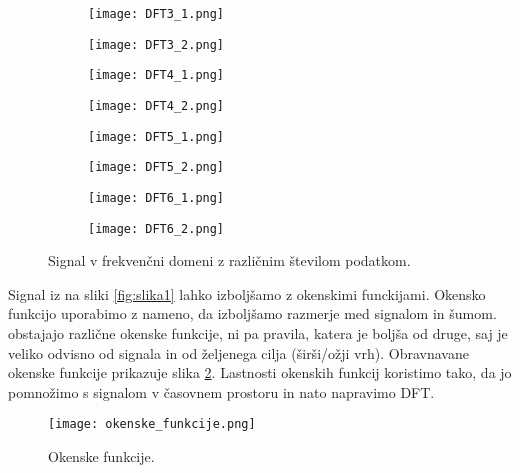 \documentclass[12pt,a4paper]{article}
\begin{document}
\begin{figure}[H]
    \centering
    \begin{subfigure}[b]{0.45\textwidth}
        \texttt{[image: DFT3\_1.png]}
    \end{subfigure}
    \begin{subfigure}[b]{0.45\textwidth}
        \texttt{[image: DFT3\_2.png]}
    \end{subfigure}
    
        \begin{subfigure}[b]{0.45\textwidth}
        \texttt{[image: DFT4\_1.png]}
    \end{subfigure}
    \begin{subfigure}[b]{0.45\textwidth}
        \texttt{[image: DFT4\_2.png]}
    \end{subfigure}
    
        \begin{subfigure}[b]{0.45\textwidth}
        \texttt{[image: DFT5\_1.png]}
    \end{subfigure}
    \begin{subfigure}[b]{0.45\textwidth}
        \texttt{[image: DFT5\_2.png]}
    \end{subfigure}
    
        \begin{subfigure}[b]{0.45\textwidth}
        \texttt{[image: DFT6\_1.png]}
    \end{subfigure}
    \begin{subfigure}[b]{0.45\textwidth}
        \texttt{[image: DFT6\_2.png]}
    \end{subfigure}
    \caption{Signal v frekvenčni domeni z različnim številom podatkom.} \label{fig:slika4}
\end{figure}

Signal iz na sliki \ref{fig:slika1} lahko izboljšamo z okenskimi funckijami. Okensko funkcijo uporabimo z nameno, da izboljšamo razmerje med signalom in šumom. obstajajo različne okenske funkcije, ni pa pravila, katera je boljša od druge, saj je veliko odvisno od signala in od željenega cilja (širši/ožji vrh). Obravnavane okenske funkcije prikazuje slika \ref{fig:slika5}. Lastnosti okenskih funkcij koristimo tako, da jo pomnožimo s signalom v časovnem prostoru in nato napravimo DFT.
\begin{figure}[H]
    \centering
        \texttt{[image: okenske\_funkcije.png]}
    \caption{Okenske funkcije.} \label{fig:slika5}
\end{figure}
\end{document}

